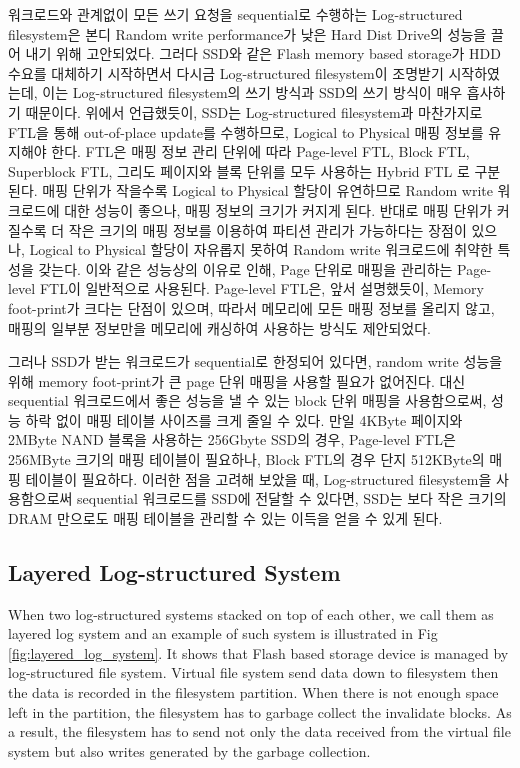 \documentclass[letterpaper,twocolumn,10pt]{article}
\begin{document}
워크로드와 관계없이 모든 쓰기 요청을 sequential로 수행하는 Log-structured filesystem은 본디 Random write performance가 낮은 Hard Dist Drive의 성능을 끌어 내기 위해 고안되었다. 그러다 SSD와 같은 Flash memory based storage가 HDD 수요를 대체하기 시작하면서 다시금 Log-structured filesystem이 조명받기 시작하였는데, 이는 Log-structured filesystem의 쓰기 방식과 SSD의 쓰기 방식이 매우 흡사하기 때문이다. 위에서 언급했듯이, SSD는 Log-structured filesystem과 마찬가지로 FTL을 통해 out-of-place update를 수행하므로, Logical to Physical 매핑 정보를 유지해야 한다. FTL은 매핑 정보 관리 단위에 따라 Page-level FTL, Block FTL\cite{kim2002space}, Superblock FTL\cite{kang2006superblock}, 그리도 페이지와 블록 단위를 모두 사용하는 Hybrid FTL\cite{fast07}\cite{last08} 로 구분된다. 매핑 단위가 작을수록 Logical to Physical 할당이 유연하므로 Random write 워크로드에 대한 성능이 좋으나, 매핑 정보의 크기가 커지게 된다. 반대로 매핑 단위가 커질수록 더 작은 크기의 매핑 정보를 이용하여 파티션 관리가 가능하다는 장점이 있으나, Logical to Physical 할당이 자유롭지 못하여 Random write 워크로드에 취약한 특성을 갖는다. 이와 같은 성능상의 이유로 인해, Page 단위로 매핑을 관리하는 Page-level FTL이 일반적으로 사용된다. Page-level FTL은, 앞서 설명했듯이, Memory foot-print가 크다는 단점이 있으며, 따라서 메모리에 모든 매핑 정보를 올리지 않고, 매핑의 일부분 정보만을 메모리에 캐싱하여 사용하는 방식도 제안되었다\cite{dftl09}.

그러나 SSD가 받는 워크로드가 sequential로 한정되어 있다면, random write 성능을 위해 memory foot-print가 큰 page 단위 매핑을 사용할 필요가 없어진다. 대신 sequential 워크로드에서 좋은 성능을 낼 수 있는 block 단위 매핑을 사용함으로써, 성능 하락 없이 매핑 테이블 사이즈를 크게 줄일 수 있다. 만일 4KByte 페이지와 2MByte NAND 블록을 사용하는 256Gbyte SSD의 경우, Page-level FTL은 256MByte 크기의 매핑 테이블이 필요하나, Block FTL의 경우 단지 512KByte의 매핑 테이블이 필요하다. 이러한 점을 고려해 보았을 때, Log-structured filesystem을 사용함으로써 sequential 워크로드를 SSD에 전달할 수 있다면, SSD는 보다 작은 크기의 DRAM 만으로도 매핑 테이블을 관리할 수 있는 이득을 얻을 수 있게 된다.

\subsection{Layered Log-structured System}

When two log-structured systems stacked on top of each other, we call them as layered log system and an example of such system is illustrated in Fig \ref{fig:layered_log_system}. It shows that Flash based storage device is managed by log-structured file system. Virtual file system send data down to filesystem then the data is recorded in the filesystem partition. When there is not enough space left in the partition, the filesystem has to garbage collect the invalidate blocks. As a result, the filesystem has to send not only the data received from the virtual file system but also writes generated by the garbage collection.
\end{document}
